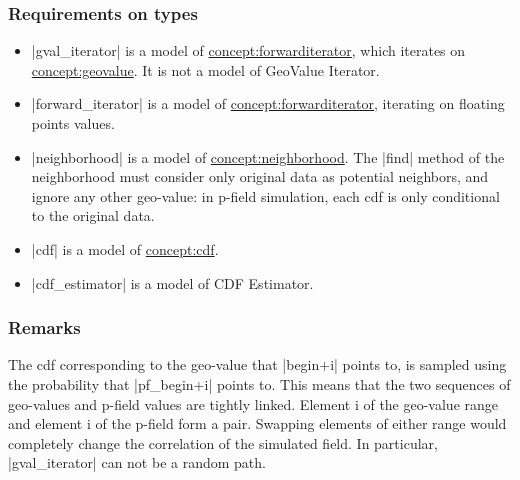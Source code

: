 \documentclass[12pt,twoside]{report}
\begin{document}
\htmlrule[CLEAR=all]  \subsubsection*{Requirements on types}
\begin{itemize}
\item |gval_iterator| is a model of \hyperref{Forward Iterator}{Forward Iterator (see Section}{)}{concept:forwarditerator}, which iterates on \hyperref{Geo-Values}{Geo-Values (see Section}{)}{concept:geovalue}. It is not a model of GeoValue Iterator.
\item |forward_iterator| is a model of \hyperref{Forward Iterator}{Forward Iterator (see Section}{)}{concept:forwarditerator}, iterating on floating points values.
\item |neighborhood| is a model of \hyperref{Neighborhood}{Neighborhood (see Section}{)}{concept:neighborhood}. The |find| method of the neighborhood must consider only original data as potential neighbors, and ignore any other geo-value: in p-field simulation, each cdf is only conditional to the original data. 
\item |cdf| is a model of \hyperref{Cdf}{Cdf}{}{concept:cdf}.
\item |cdf_estimator| is a model of CDF Estimator.
\end{itemize}


\htmlrule[CLEAR=all]  \subsubsection*{Remarks}
The cdf corresponding to the geo-value that |begin+i| points to, is sampled using the probability that |pf_begin+i| points to. This means that the two sequences of geo-values and p-field values are tightly linked. Element i of the geo-value range and element i of the p-field form a pair. Swapping elements of either range would completely change the correlation of the simulated field. In particular, |gval_iterator| can not be a random path.












\end{document}
